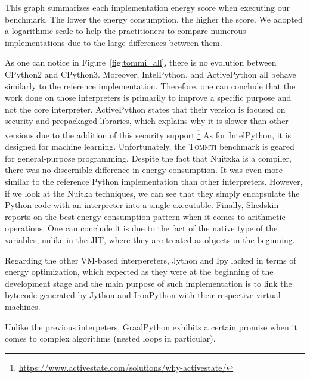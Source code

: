 This graph summarizes each implementation energy score when executing our benchmark.
The lower the energy consumption, the higher the score.
We adopted a logarithmic scale to help the practitioners to compare numerous implementations due to the large differences between them.


As one can notice in Figure~\ref{fig:tommi_all}, there is no evolution between CPython2 and CPython3.
Moreover, IntelPython, and ActivePython all behave similarly to the reference implementation.
Therefore, one can conclude that the work done on those interpreters is primarily to improve a specific purpose and not the core interpreter.
ActivePython states that their version is focused on security and prepackaged libraries, which explains why it is slower than other versions due to the addition of this security support.\footnote{\url{https://www.activestate.com/solutions/why-activestate/}}
As for IntelPython, it is designed for machine learning.
Unfortunately, the \textsc{Tommti} benchmark is geared for general-purpose programming.
Despite the fact that Nuitxka is a compiler, there was no discernible difference in energy consumption.
It was even more similar to the reference Python implementation than other interpreters.
However, if we look at the Nuitka techniques, we can see that they simply encapsulate the Python code with an interpreter into a single executable.
Finally, Shedskin reports on the best energy consumption pattern when it comes to arithmetic operations.
One can conclude it is due to the fact of the native type of the variables, unlike in the JIT, where they are treated as objects in the beginning.

Regarding the other VM-based interpereters, Jython and Ipy lacked in terms of energy optimization, which expected as they were at the beginning of the development stage and the main purpose of such implementation is to link the bytecode generated by Jython and IronPython with their respective virtual machines.

Unlike the previous interpeters, GraalPython exhibits a certain promise when it comes to complex algorithms (nested loops in particular).



